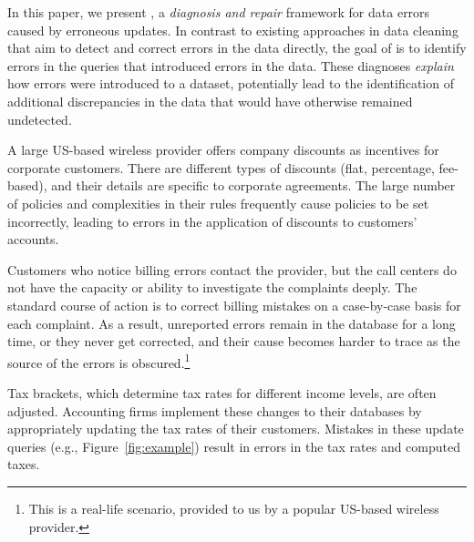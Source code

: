In this paper, we present \sys, a \emph{diagnosis and repair} framework for data errors
caused by erroneous updates. In contrast to existing approaches in data
cleaning that aim to detect and correct errors in the data directly, the goal
of \sys is to identify errors in the queries that introduced errors in the
data. These diagnoses \emph{explain} how errors were introduced to a
dataset,  potentially lead to the identification of additional discrepancies in
the data that would have otherwise remained undetected.

\begin{example}\label{ex:telco}

A large US-based wireless provider offers company discounts as incentives for
corporate customers. There are different types of discounts (flat, percentage,
fee-based), and their details are specific to corporate agreements. The large
number of policies and complexities in their rules frequently cause policies
to be set incorrectly, leading to errors in the application of discounts to
customers' accounts.

Customers who notice billing errors contact the provider, but the call centers
do not have the capacity or ability to investigate the complaints deeply. The
standard course of action is to correct billing mistakes on a case-by-case
basis for each complaint. As a result, unreported errors remain in the
database for a long time, or they never get corrected, and their cause becomes
harder to trace as the source of the errors is obscured.\footnote{This is a real-life scenario, provided to us by a popular US-based wireless provider.}

\end{example}

\begin{example}\label{ex:taxes}
    
Tax brackets, which determine tax rates for different income levels, are
often adjusted. Accounting firms implement these changes to their
databases by appropriately updating the tax rates of their customers. Mistakes
in these update queries (e.g., Figure~\ref{fig:example}) result in errors in
the tax rates and computed taxes. 

\end{example}

